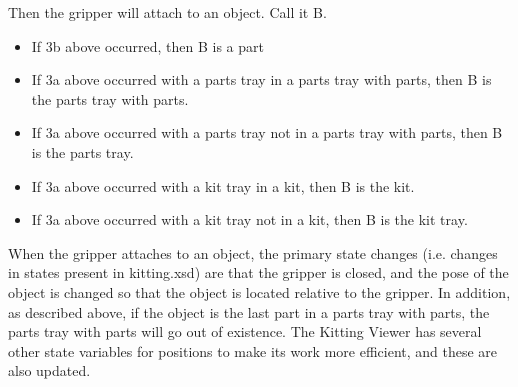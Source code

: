 Then the gripper will attach to an object. Call it B.

\begin{itemize}

\item If 3b above occurred, then B is a part

\item If 3a above occurred with a parts tray in a parts tray with parts,
   then B is the parts tray with parts.

\item If 3a above occurred with a parts tray not in a parts tray with parts,
   then B is the parts tray.

\item If 3a above occurred with a kit tray in a kit, then B is the kit.

\item If 3a above occurred with a kit tray not in a kit, then B is the kit tray.

\end{itemize}

When the gripper attaches to an object, the primary state changes (i.e.
changes in states present in kitting.xsd) are that the gripper is closed,
and the pose of the object is changed so that the object is located
relative to the gripper. In addition, as described above, if the object is
the last part in a parts tray with parts, the parts tray with parts will go
out of existence. The Kitting Viewer has several other state variables for
positions to make its work more efficient, and these are also updated.

